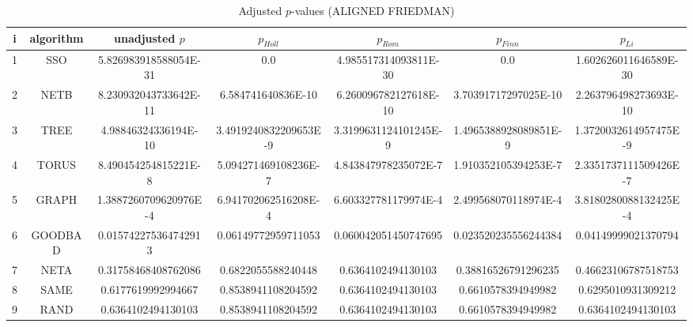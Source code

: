 \documentclass[a4paper,10pt]{article}
\begin{document}
\begin{landscape}
\begin{table}[!htp]
\centering\scriptsize
\caption{Adjusted $p$-values (ALIGNED FRIEDMAN)}
\begin{tabular}{ccccccc}
i&algorithm&unadjusted $p$&$p_{Holl}$&$p_{Rom}$&$p_{Finn}$&$p_{Li}$\\
\hline
1& SSO&5.826983918588054E-31&0.0&4.985517314093811E-30&0.0&1.602626011646589E-30\\
2& NETB&8.230932043733642E-11&6.584741640836E-10&6.260096782127618E-10&3.70391717297025E-10&2.263796498273693E-10\\
3& TREE&4.98846324336194E-10&3.4919240832209653E-9&3.3199631124101245E-9&1.4965388928089851E-9&1.3720032614957475E-9\\
4& TORUS&8.490454254815221E-8&5.094271469108236E-7&4.843847978235072E-7&1.910352105394253E-7&2.3351737111509426E-7\\
5& GRAPH&1.3887260709620976E-4&6.941702062516208E-4&6.603327781179974E-4&2.499568070118974E-4&3.8180280088132425E-4\\
6& GOODBAD&0.015742275364742913&0.06149772959711053&0.060042051450747695&0.023520235556244384&0.04149999021370794\\
7& NETA&0.31758468408762086&0.6822055588240448&0.6364102494130103&0.38816526791296235&0.46623106787518753\\
8& SAME&0.6177619992994667&0.8538941108204592&0.6364102494130103&0.6610578394949982&0.6295010931309212\\
9& RAND&0.6364102494130103&0.8538941108204592&0.6364102494130103&0.6610578394949982&0.6364102494130103\\
\hline
\end{tabular}
\end{table}


\newpage


\end{landscape}
\end{document}
